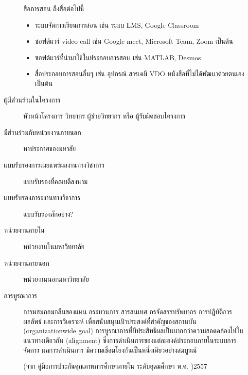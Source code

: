 \documentclass[a4paper,12pt,english]{sphinxmanual}
\begin{document}
\begin{description}
สื่อการสอน  ถึงสื่อต่อไปนี้
\begin{itemize}
\item {} 
ระบบจัดการเรียนการสอน เช่น ระบบ LMS, Google Classroom

\item {} 
ซอฟต์แวร์ video call เช่น Google meet, Microsoft Team, Zoom เป็นต้น

\item {} 
ซอฟต์แวร์ที่นำมาใช้ในประกอบการสอน เช่น MATLAB, Desmos

\item {} 
สื่อประกอบการสอนอื่นๆ เช่น อุปกรณ์ สารเคมี VDO หนังสือที่ไม่ได้พัฒนาด้วยตนเอง เป็นต้น

\end{itemize}

\item[{ผู้มีส่วนร่วมในโครงการ\index{ผู้มีส่วนร่วมในโครงการ@\spxentry{ผู้มีส่วนร่วมในโครงการ}|spxpagem}\phantomsection\label{\detokenize{glossary:term-5}}}] \leavevmode
หัวหน้าโครงการ วิทยากร ผู้ช่วยวิทยากร หรือ ผู้รับผิดชอบโครงการ

\item[{มีส่วนร่วมกับหน่วยงานภายนอก\index{มีส่วนร่วมกับหน่วยงานภายนอก@\spxentry{มีส่วนร่วมกับหน่วยงานภายนอก}|spxpagem}\phantomsection\label{\detokenize{glossary:term-6}}}] \leavevmode
หาประกาศของมหาลัย

\item[{แบบรับรองการเผยแพร่ผลงานทางวิชาการ\index{แบบรับรองการเผยแพร่ผลงานทางวิชาการ@\spxentry{แบบรับรองการเผยแพร่ผลงานทางวิชาการ}|spxpagem}\phantomsection\label{\detokenize{glossary:term-7}}}] \leavevmode
แบบรับรองที่คณบดีลงนาม

\item[{แบบรับรองภาระงานทางวิชาการ\index{แบบรับรองภาระงานทางวิชาการ@\spxentry{แบบรับรองภาระงานทางวิชาการ}|spxpagem}\phantomsection\label{\detokenize{glossary:term-8}}}] \leavevmode
แบบรับรองสักอย่าง?

\item[{หน่วยงานภายใน\index{หน่วยงานภายใน@\spxentry{หน่วยงานภายใน}|spxpagem}\phantomsection\label{\detokenize{glossary:term-9}}}] \leavevmode
หน่วยงานในมหาวิทยาลัย

\item[{หน่วยงานภายนอก\index{หน่วยงานภายนอก@\spxentry{หน่วยงานภายนอก}|spxpagem}\phantomsection\label{\detokenize{glossary:term-10}}}] \leavevmode
หน่วยงานนอกมหาวิทยาลัย

\item[{การบูรณาการ\index{การบูรณาการ@\spxentry{การบูรณาการ}|spxpagem}\phantomsection\label{\detokenize{glossary:term-11}}}] \leavevmode
การผสมกลมกลืนของแผน กระบวนการ สารสนเทศ กรจัดสรรทรัพยากร การปฏิบัติการ ผลลัพธ์ และการวิเคราะห์ เพื่อสนับสนุนเป้าประสงค์ที่สำคัญของสถานบัน (organization\sphinxhyphen{}wide goal) การบูรณาการที่มีประสิทธิผลเป็นมากกว่าความสอดคล้องไปในแนวทางเดียวกัน (alignment) ซึ่งการดำเนินการของแต่ละองค์ประกอบภายในระบบการจัดการ ผลการดำเนินการ มีความเชื่อมโยงกันเป็นหนึ่งเดียวอย่างสมบูรณ์

(จาก คู่มือการประกันคุณภาพการศึกษาภายใน ระดับอุดมศึกษา พ.ศ. )2557

\end{description}
\end{document}
